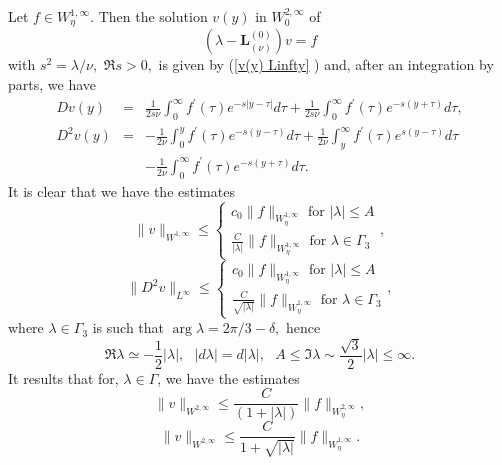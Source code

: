 \documentclass[11pt]{article}
\begin{document}
Let $f\in W_{\eta}^{1,\infty }$. Then the solution $v(y)$ in $%
W_{0}^{2,\infty }$ of%
\begin{equation*}
(\lambda -\boldsymbol{L}_{(\nu )}^{(0)})v=f
\end{equation*}%
with $s^{2}=\lambda /\nu ,$ $\Re s>0,$ is given by (\ref{v(y) Linfty}%
) and, after an integration by parts, we have%
\begin{eqnarray*}
Dv(y) &=&\frac{1}{2s\nu }\int_{0}^{\infty }f^{\prime }(\tau )e^{-s|y-\tau
|}d\tau +\frac{1}{2s\nu }\int_{0}^{\infty }f^{\prime }(\tau )e^{-s(y+\tau
)}d\tau , \\
D^{2}v(y) &=&-\frac{1}{2\nu }\int_{0}^{y}f^{\prime }(\tau )e^{-s(y-\tau
)}d\tau +\frac{1}{2\nu }\int_{y}^{\infty }f^{\prime }(\tau )e^{s(y-\tau
)}d\tau \\
&&-\frac{1}{2\nu }\int_{0}^{\infty }f^{\prime }(\tau )e^{-s(y+\tau )}d\tau .
\end{eqnarray*}%
It is clear that we have the estimates 
\begin{equation}
\|v\|_{W^{1,\infty }}\leq \left\{ 
\begin{array}{c}
c_{0}\|f\|_{W_{\eta}^{1,\infty }}\text{ for }|\lambda |\leq A \\ 
\frac{C}{|\lambda |}\|f\|_{W_{\eta}^{1,\infty }}\text{ for }\lambda \in \Gamma
_{3}%
\end{array}%
\right. ,  \label{estim inv L-lambda 0-mode}
\end{equation}%
\begin{equation*}
\|D^{2}v\|_{L^{\infty }}\leq \left\{ 
\begin{array}{c}
c_{0}\|f\|_{W_{\eta}^{1,\infty }}\text{ for }|\lambda |\leq A \\ 
\frac{C}{\sqrt{|\lambda |}}\|f\|_{W_{\eta}^{1,\infty }}\text{ for }\lambda \in
\Gamma _{3}%
\end{array}%
\right. ,
\end{equation*}%
where $\lambda \in \Gamma _{3}$ is such that $\arg \lambda =2\pi /3-\delta ,$
hence%
\begin{equation*}
\Re \lambda \simeq -\frac{1}{2}|\lambda |,\text{ }|d\lambda |=d|\lambda |,%
\text{ }A\leq \Im \lambda \sim \frac{\sqrt{3}}{2}|\lambda |\leq \infty .
\end{equation*}%
It results that for, $\lambda \in \Gamma$, we have the estimates%
\begin{equation}
\|v\|_{W^{2,\infty }}\leq \frac{C}{(1+|\lambda |)}\|f\|_{W_{\eta}^{2,\infty }},
\label{estim resol L(0) b}
\end{equation}%
\begin{equation}
\|v\|_{W^{2,\infty }}\leq \frac{C}{1+\sqrt{|\lambda |}}\|f\|_{W_{\eta}^{1,%
\infty }}.  \label{estim resol L(0)  a}
\end{equation}%
\end{document}
